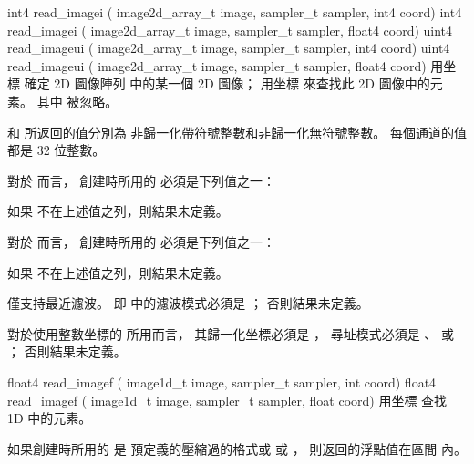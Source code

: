 int4 read_imagei (
	image2d_array_t image,
	sampler_t sampler,
	int4 coord)
int4 read_imagei (
	image2d_array_t image,
	sampler_t sampler,
	float4 coord)
uint4 read_imageui (
	image2d_array_t image,
	sampler_t sampler,
	int4 coord)
uint4 read_imageui (
	image2d_array_t image,
	sampler_t sampler,
	float4 coord)
\stopbuffer
{}
用坐標  確定 2D 圖像陣列  中的某一個 2D 圖像；
用坐標  來查找此 2D 圖像中的元素。
其中  被忽略。

 和  所返回的值分別為
非歸一化帶符號整數和非歸一化無符號整數。
每個通道的值都是 32 位整數。

對於  而言，
創建時所用的  必須是下列值之一：
\startigBase[indentnext=no]
\item {}
\item {}
\item {}
\stopigBase
如果  不在上述值之列，則結果未定義。

對於  而言，
創建時所用的  必須是下列值之一：
\startigBase[indentnext=no]
\item {}
\item {}
\item {}
\stopigBase
如果  不在上述值之列，則結果未定義。

 僅支持最近濾波。
即  中的濾波模式必須是 ；
否則結果未定義。

對於使用整數坐標的  所用而言，
其歸一化坐標必須是 ，
尋址模式必須是 、 
 或 ；
否則結果未定義。
\stopbuffer

float4 read_imagef (
	image1d_t image,
	sampler_t sampler,
	int coord)
float4 read_imagef (
	image1d_t image,
	sampler_t sampler,
	float coord)
\stopbuffer
{}
用坐標  查找 1D   中的元素。

如果創建時所用的  是
預定義的壓縮過的格式或  或 ，
則返回的浮點值在區間 \math{[0.0 \cdots 1.0]} 內。

